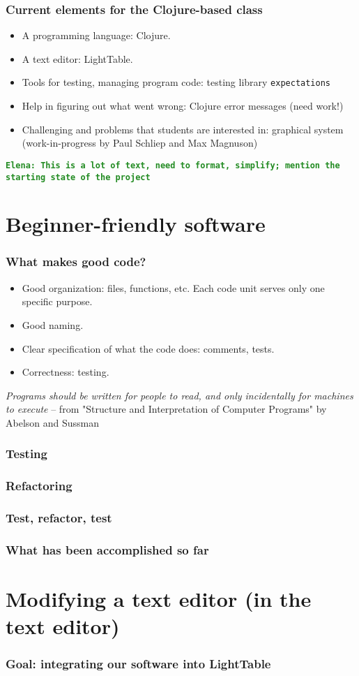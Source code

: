 \documentclass{beamer}
\newcommand{\comment}[1]{{\bf \tt  {#1}}}
\newcommand{\emcomment}[1]{\textcolor{ForestGreen}{\comment{Elena: {#1}}}}
\begin{document}
\begin{frame}[fragile]
\frametitle{Current elements for the Clojure-based class}
\begin{itemize}
\item A programming language: Clojure. 
\item A text editor: LightTable.
\item Tools for testing, managing program code: testing library {\tt expectations}
\item Help in figuring out what went wrong: Clojure error messages (need work!)
\item Challenging and problems that students are interested in: graphical system (work-in-progress by Paul Schliep and Max Magnuson)
\end{itemize}
\emcomment{This is a lot of text, need to format, simplify; mention the starting state of the project}
\end{frame}

\section{Beginner-friendly software}

\begin{frame}[fragile]
\frametitle{What makes good code?}

\begin{itemize}
\item Good organization: files, functions, etc. Each code unit serves only one specific purpose. 
\item Good naming.
\item Clear specification of what the code does: comments, tests.
\item Correctness: testing. 
\end{itemize}
{\it Programs should be written for people to read, and only incidentally for machines to execute} --	 
from "Structure and Interpretation of Computer Programs" by Abelson and Sussman	
\end{frame}

\begin{frame}[fragile]
\frametitle{Testing}
		
\end{frame}

\begin{frame}[fragile]
\frametitle{Refactoring}
		
\end{frame}

\begin{frame}[fragile]
\frametitle{Test, refactor, test}
		
\end{frame}

\begin{frame}[fragile]
\frametitle{What has been accomplished so far}
		
\end{frame}

\section{Modifying a text editor (in the text editor)}

\begin{frame}[fragile]
\frametitle{Goal: integrating our software into LightTable}
		
\end{frame}
\end{document}
